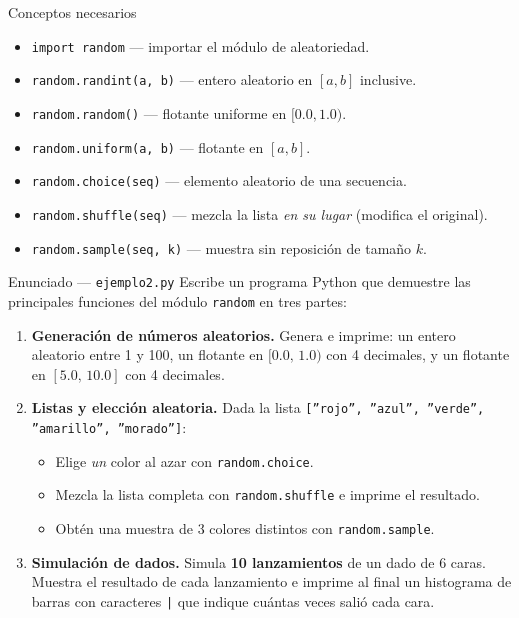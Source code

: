 \documentclass[12pt,a4paper]{article}
\begin{document}
\vspace{0.6em}
\begin{conceptobox}{Conceptos necesarios}
\begin{itemize}
  \item \texttt{import random} — importar el módulo de aleatoriedad.
  \item \texttt{random.randint(a, b)} — entero aleatorio en $[a, b]$ inclusive.
  \item \texttt{random.random()} — flotante uniforme en $[0.0, 1.0)$.
  \item \texttt{random.uniform(a, b)} — flotante en $[a, b]$.
  \item \texttt{random.choice(seq)} — elemento aleatorio de una secuencia.
  \item \texttt{random.shuffle(seq)} — mezcla la lista \emph{en su lugar} (modifica el original).
  \item \texttt{random.sample(seq, k)} — muestra sin reposición de tamaño $k$.
\end{itemize}
\end{conceptobox}

\vspace{0.8em}
\begin{enunciadobox}{Enunciado — \texttt{ejemplo2.py}}
Escribe un programa Python que demuestre las principales funciones del
módulo \texttt{random} en tres partes:

\begin{enumerate}
  \item \textbf{Generación de números aleatorios.}
        Genera e imprime: un entero aleatorio entre 1 y 100, un flotante en
        $[0.0,\,1.0)$ con 4 decimales, y un flotante en $[5.0,\,10.0]$ con 4 decimales.

  \item \textbf{Listas y elección aleatoria.}
        Dada la lista \texttt{[''rojo'', ''azul'', ''verde'', ''amarillo'', ''morado'']}:
        \begin{itemize}
          \item Elige \emph{un} color al azar con \texttt{random.choice}.
          \item Mezcla la lista completa con \texttt{random.shuffle} e imprime el resultado.
          \item Obtén una muestra de 3 colores distintos con \texttt{random.sample}.
        \end{itemize}

  \item \textbf{Simulación de dados.}
        Simula \textbf{10 lanzamientos} de un dado de 6 caras.
        Muestra el resultado de cada lanzamiento e imprime al final un histograma
        de barras con caracteres \texttt{|} que indique cuántas veces salió cada cara.
\end{enumerate}
\end{enunciadobox}
\end{document}
